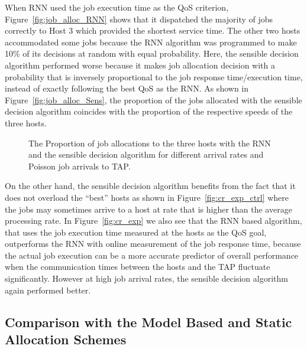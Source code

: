 \documentclass[journal]{IEEEtran}
\begin{document}
When RNN used the job execution time as the QoS criterion, Figure~\ref{fig:job_alloc_RNN} shows that it dispatched the majority of jobs correctly to Host $3$  which provided the shortest service time. The other two hosts accommodated some jobs because the RNN algorithm was programmed to make 10\% of its decisions at random with equal probability. Here, the sensible decision algorithm performed worse because it makes job allocation decision with a probability that is inversely proportional to the job response time/execution time, instead of exactly following the best QoS as the RNN. As shown in Figure~\ref{fig:job_alloc_Sens}, the proportion of the jobs allocated with the sensible decision algorithm coincides with the proportion of the respective speeds of the three hosts.


		
	\begin{figure}[ht]
		\centering
			 
     \caption{The Proportion of job allocations to the three hosts with the RNN and the sensible decision algorithm for different arrival rates and Poisson job arrivals to TAP.}
   \end{figure}
		
On the other hand, the sensible decision algorithm benefits from the fact that it does not overload the ``best'' hosts as shown in Figure~\ref{fig:cr_exp_ctrl} where the jobs may sometimes arrive to a host at rate that is higher than the average processing rate.  In Figure~\ref{fig:cr_exp} we also see that the RNN based algorithm, that uses the job execution time measured at the hosts as the QoS goal,  outperforms the RNN with online measurement of the job response time,  because the actual job execution can be a more accurate predictor of overall performance when the communication times between the hosts and the TAP
fluctuate significantly. However at high job arrival rates,  the sensible decision algorithm again performed better. 

\subsection{Comparison with the Model Based and Static Allocation Schemes}
\label{performanceevaluationofallschemes}
\end{document}
